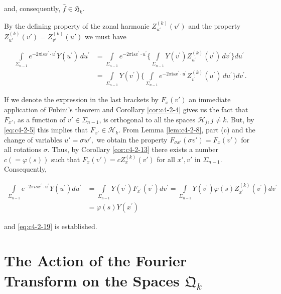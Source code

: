 and, consequently, $\hat{f} \in \mathfrak{H}_{k}$.

By the defining property of the zonal harmonic $Z_{u'}^{(k)}(v')$ and the property $Z_{u'}^{(k)}(v') = Z_{v'}^{(k)}(u')$ we must have

\[
\begin{aligned}\int\limits_{\Sigma_{n-1}}e^{-2\pi\mathrm{i}s x^{\prime}\cdot u^{\prime}}Y(u^{\prime})\,du^{\prime}&=\int\limits_{\Sigma_{n-1}}e^{-2\pi\mathrm{i}s x^{\prime}\cdot u^{\prime}}\Biggl\{\int\limits_{\Sigma_{n-1}}Y(v^{\prime})Z_{u^{\prime}}^{(k)}(v^{\prime})\,dv^{\prime}\Biggr\}du^{\prime}\\&=\int\limits_{\Sigma_{n-1}}Y(v^{\prime})\Biggl\{\int\limits_{\Sigma_{n-1}}e^{-2\pi\mathrm{i}s x^{\prime}\cdot u^{\prime}}Z_{v^{\prime}}^{(k)}(u^{\prime})\,du^{\prime}\Biggr\}dv^{\prime}.\end{aligned}
\]

If we denote the expression in the last brackets by $F_{x}(v')$ an immediate application of Fubini's theorem and Corollary \ref{cor:c4-2-4} gives us the fact that $F_{x'}$, as a function of $v' \in \Sigma_{n-1}$, is orthogonal to all the spaces $\mathcal{H}_{j}, j \neq k$. But, by \eqref{eq:c4-2-5} this implies that $F_{x'} \in \mathcal{H}_{k}$. From Lemma \ref{lem:c4-2-8}, part (c) and the change of variables $u' = \sigma w',$ we obtain the property $F_{\sigma x'}(\sigma v') = F_{x}(v')$ for all rotations $\sigma$. Thus, by Corollary \ref{cor:c4-2-13} there exists a number $c( = \varphi(s))$ such that $F_{x}(v') = cZ_{x}^{(k)}(v')$ for all $x', v'$ in $\Sigma_{n-1}$. Consequently,

\[
\begin{aligned}\int\limits_{\Sigma_{n-1}}\!e^{-2\pi i s x^{\prime}\cdot u^{\prime}}Y(u^{\prime}) du^{\prime}&=\int\limits_{\Sigma_{n-1}}Y(v^{\prime})F_{x^{\prime}}(v^{\prime}) dv^{\prime}=\int\limits_{\Sigma_{n-1}}Y(v^{\prime})\varphi(s)Z_{x^{\prime}}^{(k)}(v^{\prime}) dv^{\prime}\\&=\varphi(s)Y(x^{\prime})\end{aligned}
\]

and \eqref{eq:c4-2-19} is established.

\section{The Action of the Fourier Transform on the Spaces  $\mathfrak{Q}_{k}$}

